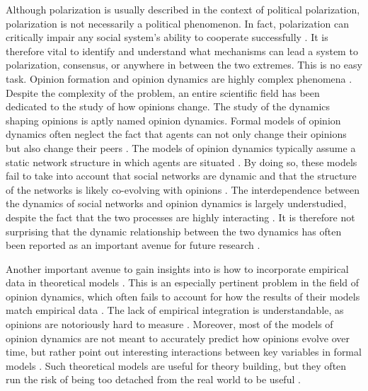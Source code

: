 \documentclass[11pt]{article}
\begin{document}
\noindent Although polarization is usually described in the context of political polarization, polarization is not necessarily a political phenomenon. In fact, polarization can critically impair any social system's ability to cooperate successfully \cite{levin_dynamics_2021}. It is therefore vital to identify and understand what mechanisms can lead a system to polarization, consensus, or anywhere in between the two extremes. This is no easy task. Opinion formation and opinion dynamics are highly complex phenomena \cite{baumann2021modeling}. 
Despite the complexity of the problem, an entire scientific field has been dedicated to the study of how opinions change. The study of the dynamics shaping opinions is aptly named opinion dynamics. Formal models of opinion dynamics often neglect the fact that agents can not only change their opinions but also change their peers \cite{flache_models_2017}. The models of opinion dynamics typically assume a static network structure in which agents are situated \cite{galesic_integrating_2021}. By doing so, these models fail to take into account that social networks are dynamic and that the structure of the networks is likely co-evolving with opinions \cite{de2022modelling,galesic_integrating_2021}. The interdependence between the dynamics of social networks and opinion dynamics is largely understudied, despite the fact that the two processes are highly interacting \cite{asikainen_cumulative_2020,bruch_agent-based_2015,galesic_integrating_2021,kossinets_origins_2009,noorazar_classical_2020}. It is therefore not surprising that the dynamic relationship between the two dynamics has often been reported as an important avenue for future research \cite{flache_models_2017,galesic_integrating_2021}. 

\noindent Another important avenue to gain insights into is how to incorporate empirical data in theoretical models \cite{mas2019challenges}. This is an especially pertinent problem in the field of opinion dynamics, which often fails to account for how the results of their models match empirical data \cite{galesic_integrating_2021,flache_models_2017, mas2019challenges}. 
The lack of empirical integration is understandable, as opinions are notoriously hard to measure \cite{mas2019challenges}. Moreover, most of the models of opinion dynamics are not meant to accurately predict how opinions evolve over time, but rather point out interesting interactions between key variables in formal models \cite{mas2019challenges}. Such theoretical models are useful for theory building, but they often run the risk of being too detached from the real world to be useful \cite{smaldino_how_2020, mas2019challenges}.  
\end{document}
